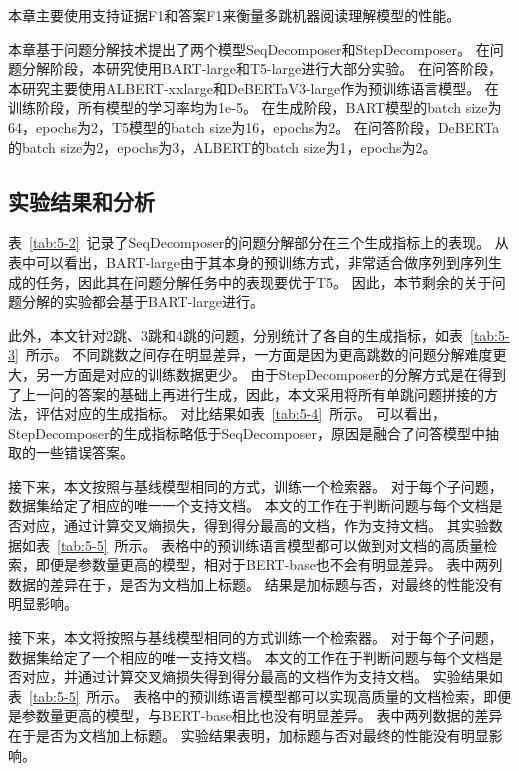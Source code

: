本章主要使用支持证据F1和答案F1来衡量多跳机器阅读理解模型的性能。

本章基于问题分解技术提出了两个模型SeqDecomposer和StepDecomposer。
在问题分解阶段，本研究使用BART-large\cite{Lewis2019BARTDS}和T5-large\cite{Ni2021SentenceT5SS}进行大部分实验。
在问答阶段，本研究主要使用ALBERT-xxlarge\cite{lan2019albert}和DeBERTaV3-large作为预训练语言模型。
在训练阶段，所有模型的学习率均为1e-5。
在生成阶段，BART模型的batch size为64，epochs为2，T5模型的batch size为16，epochs为2。
在问答阶段，DeBERTa的batch size为2，epochs为3，ALBERT的batch size为1，epochs为2。

\subsection{实验结果和分析}
表~\ref{tab:5-2}~记录了SeqDecomposer的问题分解部分在三个生成指标上的表现。
从表中可以看出，BART-large由于其本身的预训练方式，非常适合做序列到序列生成的任务，因此其在问题分解任务中的表现要优于T5。
因此，本节剩余的关于问题分解的实验都会基于BART-large进行。



此外，本文针对2跳、3跳和4跳的问题，分别统计了各自的生成指标，如表~\ref{tab:5-3}~所示。
不同跳数之间存在明显差异，一方面是因为更高跳数的问题分解难度更大，另一方面是对应的训练数据更少。
由于StepDecomposer的分解方式是在得到了上一问的答案的基础上再进行生成，因此，本文采用将所有单跳问题拼接的方法，评估对应的生成指标。
对比结果如表~\ref{tab:5-4}~所示。
可以看出，StepDecomposer的生成指标略低于SeqDecomposer，原因是融合了问答模型中抽取的一些错误答案。





接下来，本文按照与基线模型相同的方式，训练一个检索器。
对于每个子问题，数据集给定了相应的唯一一个支持文档。
本文的工作在于判断问题与每个文档是否对应，通过计算交叉熵损失，得到得分最高的文档，作为支持文档。
其实验数据如表~\ref{tab:5-5}~所示。
表格中的预训练语言模型都可以做到对文档的高质量检索，即便是参数量更高的模型，相对于BERT-base也不会有明显差异。
表中两列数据的差异在于，是否为文档加上标题。
结果是加标题与否，对最终的性能没有明显影响。

接下来，本文将按照与基线模型相同的方式训练一个检索器。
对于每个子问题，数据集给定了一个相应的唯一支持文档。
本文的工作在于判断问题与每个文档是否对应，并通过计算交叉熵损失得到得分最高的文档作为支持文档。
实验结果如表~\ref{tab:5-5}~所示。
表格中的预训练语言模型都可以实现高质量的文档检索，即便是参数量更高的模型，与BERT-base相比也没有明显差异。
表中两列数据的差异在于是否为文档加上标题。
实验结果表明，加标题与否对最终的性能没有明显影响。

